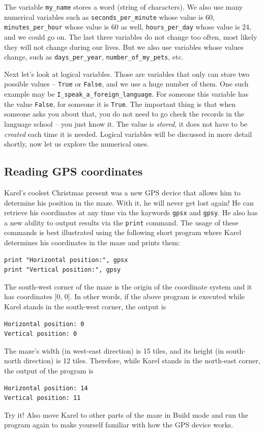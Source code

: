 {{{{The variable {\tt my\_name} stores a word (string of characters). We also use many numerical variables such as
{\tt seconds\_per\_minute} whose value is 60, {\tt minutes\_per\_hour} whose value is 60 as well, 
{\tt hours\_per\_day} whose value is 24, and we could go on. The last three variables do not change 
too often, most likely they will not change during our lives. But we also use variables whose 
values change, such as {\tt days\_per\_year}, {\tt number\_of\_my\_pets}, etc.

Next let's look at logical variables. Those are variables that only can store two possible values --
{\tt True} or {\tt False}, and we use a huge number of them. One such example may be {\tt I\_speak\_a\_foreign\_language}.
For someone this variable has the value {\tt False}, for someone it is {\tt True}. The important 
thing is that when someone asks you about that, you do not need to go check the records in the language 
school -- you just know it. The value is {\em stored}, it does not have to be {\em created} each time 
it is needed. Logical variables will be discussed in more detail shortly, now let us explore 
the numerical ones.

\subsection{Reading GPS coordinates}

Karel's coolest Christmas present was a new GPS device that allows him to determine his position 
in the maze. With it, he will never get lost again! He can retrieve his coordinates at any time via the 
kaywords {\tt gpsx} and {\tt gpsy}. He also has a new ability to output results via the {\tt print} 
command. The usage of these commands is best illustrated using the following short program where 
Karel determines his coordinates in the maze and prints them:

\begin{verbatim}
print "Horizontal position:", gpsx
print "Vertical position:", gpsy
\end{verbatim}
The south-west corner of the maze is the origin of the coordinate system and it has 
coordinates [0, 0]. In other words, if the above program is executed while Karel stands 
in the south-west corner, the output is

\begin{verbatim}
Horizontal position: 0
Vertical position: 0
\end{verbatim}
The maze's width (in west-east direction) is 15 tiles, and its height (in south-north direction) 
is 12 tiles. Therefore, while Karel stands in the north-east corner, the output of the program is
\begin{verbatim}
Horizontal position: 14
Vertical position: 11
\end{verbatim}
Try it! Also move Karel to other parts of the maze in Build mode and run the program again
to make yourself familiar with how the GPS device works.

}}}}
